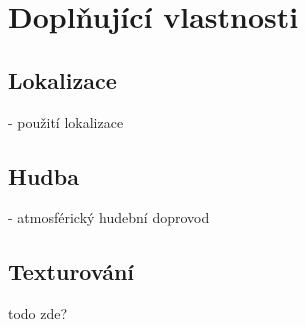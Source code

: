 
\section{Doplňující vlastnosti}



\subsection{Lokalizace}

- použití lokalizace 

\subsection{Hudba}

- atmosférický hudební doprovod

\subsection{Texturování}

todo zde?
